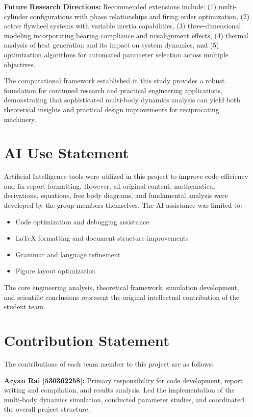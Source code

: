 \documentclass[10pt]{article}
\begin{document}
\textbf{Future Research Directions:} Recommended extensions include: (1) multi-cylinder configurations with phase relationships and firing order optimization, (2) active flywheel systems with variable inertia capabilities, (3) three-dimensional modeling incorporating bearing compliance and misalignment effects, (4) thermal analysis of heat generation and its impact on system dynamics, and (5) optimization algorithms for automated parameter selection across multiple objectives.

The computational framework established in this study provides a robust foundation for continued research and practical engineering applications, demonstrating that sophisticated multi-body dynamics analysis can yield both theoretical insights and practical design improvements for reciprocating machinery.

\section{AI Use Statement}

Artificial Intelligence tools were utilized in this project to improve code efficiency and fix report formatting. However, all original content, mathematical derivations, equations, free body diagrams, and fundamental analysis were developed by the group members themselves. The AI assistance was limited to:

\begin{itemize}
    \item Code optimization and debugging assistance
    \item LaTeX formatting and document structure improvements  
    \item Grammar and language refinement
    \item Figure layout optimization
\end{itemize}

The core engineering analysis, theoretical framework, simulation development, and scientific conclusions represent the original intellectual contribution of the student team.

\section{Contribution Statement}

The contributions of each team member to this project are as follows:

\textbf{Aryan Rai [530362258]:} Primary responsibility for code development, report writing and compilation, and results analysis. Led the implementation of the multi-body dynamics simulation, conducted parameter studies, and coordinated the overall project structure.
\end{document}
